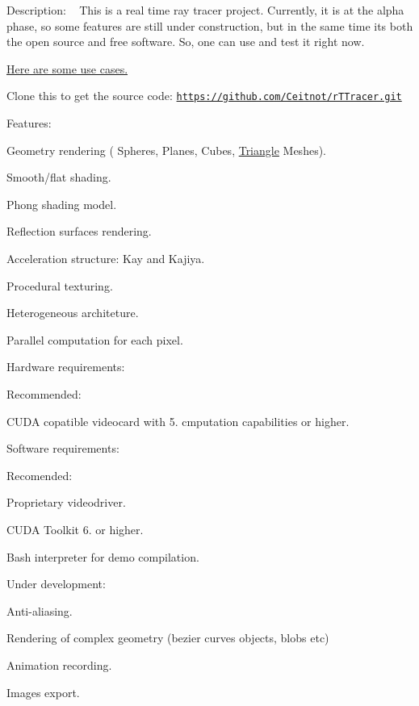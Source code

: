
\begin{DoxyItemize}
\item Description\+: ~\newline
 This is a real time ray tracer project. Currently, it is at the alpha phase, so some features are still under construction, but in the same time it\textquotesingle{}s both the open source and free software. So, one can use and test it right now.
\begin{DoxyItemize}
\item \hyperlink{group__usecase}{Here are some use cases.}
\item Clone this to get the source code\+: \href{https://github.com/Ceitnot/rTTracer.git}{\tt https\+://github.\+com/\+Ceitnot/r\+T\+Tracer.\+git}
\end{DoxyItemize}
\item Features\+:
\begin{DoxyItemize}
\item Geometry rendering ( Spheres, Planes, Cubes, \hyperlink{class_triangle}{Triangle} Meshes).
\item Smooth/flat shading.
\item Phong shading model.
\item Reflection surfaces rendering.
\item Acceleration structure\+: Kay and Kajiya.
\item Procedural texturing.
\item Heterogeneous architeture.
\item Parallel computation for each pixel.
\end{DoxyItemize}
\item Hardware requirements\+:
\begin{DoxyItemize}
\item Recommended\+:
\begin{DoxyItemize}
\item C\+U\+DA copatible videocard with 5. cmputation capabilities or higher.
\end{DoxyItemize}
\end{DoxyItemize}
\item Software requirements\+:
\begin{DoxyItemize}
\item Recomended\+:
\begin{DoxyItemize}
\item Proprietary videodriver.
\item C\+U\+DA Toolkit 6. or higher.
\item Bash interpreter for demo compilation.
\end{DoxyItemize}
\end{DoxyItemize}
\item Under development\+:
\begin{DoxyItemize}
\item Anti-\/aliasing.
\item Rendering of complex geometry (bezier curves objects, blobs etc)
\item Animation recording.
\item Images export. 
\end{DoxyItemize}
\end{DoxyItemize}